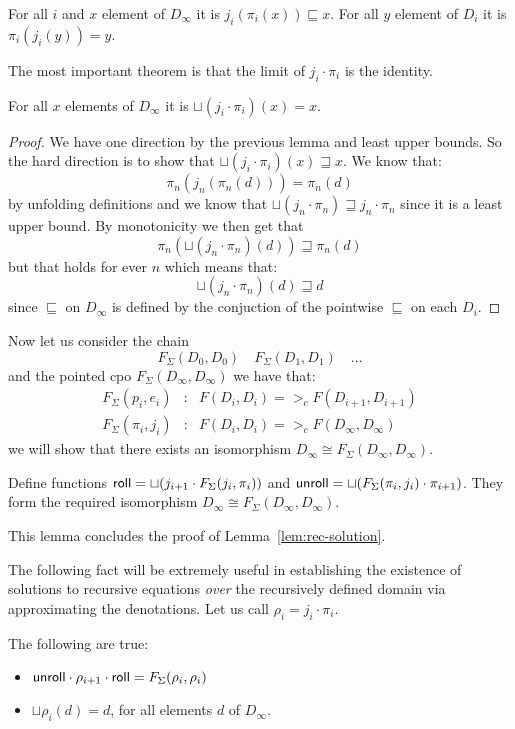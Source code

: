 \documentclass[preprint,nocopyrightspace,draft]{sigplanconf}
\begin{document}
\begin{lemma}
For all $i$ and $x$ element of $D_{\infty}$ it is $j_i(\pi_i(x)) \sqsubseteq x$.
For all $y$ element of $D_{i}$ it is $\pi_i(j_i(y)) = y$.
\end{lemma}
The most important theorem is that the limit of $j_i\cdot\pi_i$ is the identity.
\begin{lemma}\label{lem:id-sqcup}
For all $x$ elements of $D_{\infty}$ it is $\sqcup(j_i\cdot\pi_i)(x) = x$.
\end{lemma}
\begin{proof} We have one direction by the previous lemma and least upper bounds.
So the hard direction is to show that $\sqcup(j_i\cdot\pi_i)(x) \sqsupseteq x$. 
We know that:
\[       \pi_n(j_n(\pi_n(d))) = \pi_n(d) \]
by unfolding definitions and we know that $\sqcup(j_n\cdot\pi_n) \sqsupseteq j_n\cdot\pi_n$
since it is a least upper bound. By monotonicity we then get that 
\[      \pi_n(\sqcup(j_n\cdot\pi_n)(d)) \sqsupseteq \pi_n(d) \] 
but that holds for ever $n$ which means that:
\[       \sqcup(j_n\cdot\pi_n)(d) \sqsupseteq d \] 
since $\sqsubseteq$ on $D_\infty$ is defined by the conjuction of the 
pointwise $\sqsubseteq$ on each $D_i$.
\end{proof}
Now let us consider the chain 
\[ F_{\Sigma}(D_0,D_0) \quad F_{\Sigma}(D_1,D_1) \quad \ldots \] 
and the pointed cpo $F_{\Sigma}(D_{\infty},D_{\infty})$ we have that:
\[\begin{array}{lcl}
    F_{\Sigma}(p_i,e_i)   & : & F(D_i,D_i) =>_c F(D_{i+1},D_{i+1}) \\ 
    F_{\Sigma}(\pi_i,j_i) & : & F(D_i,D_i) =>_c F(D_{\infty},D_{\infty})
\end{array}\] 
we will show that there exists an isomorphism $D_\infty \cong F_{\Sigma}(D_\infty,D_\infty)$.

\begin{lemma} Define functions $\mathsf{roll} = \sqcup(j_{i+1}\cdot F_{\Sigma}(j_i,\pi_i))$ and 
$\mathsf{unroll} = \sqcup (F_{\Sigma}(\pi_i,j_i)\cdot \pi_{i+1})$. They form the required isomorphism 
$D_\infty \cong F_{\Sigma}(D_\infty,D_\infty)$.
\end{lemma}
This lemma concludes the proof of Lemma~\ref{lem:rec-solution}.

The following fact will be extremely useful in establishing the existence of solutions
to recursive equations {\em over} the recursively defined domain via approximating the
denotations. Let us call $\rho_i = j_i\cdot\pi_i$. 

\begin{theorem}\label{lem:min-inv-reqs} The following are true:
\begin{itemize} 
   \item $\mathsf{unroll} \cdot \rho_{i+1} \cdot \mathsf{roll} = F_{\Sigma}(\rho_i,\rho_i)$ 
   \item $\sqcup\rho_i(d) = d$, for all elements $d$ of $D_{\infty}$.
\end{itemize}
\end{theorem}
\end{document}
